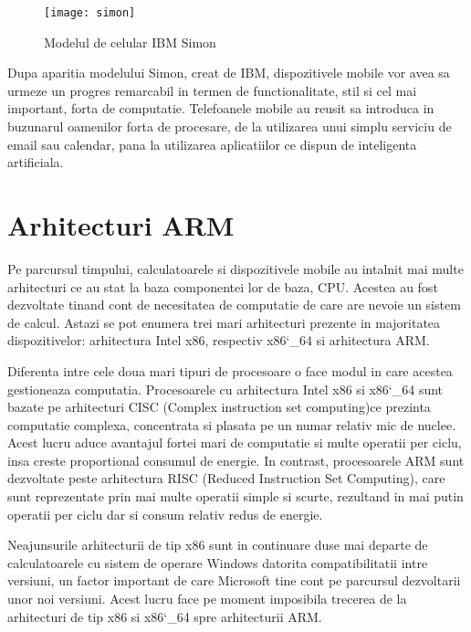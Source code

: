 	
	
		\begin{figure}[H]
		\texttt{[image: simon]}  
		\caption{\label{fig:simon} Modelul de celular IBM Simon
			\protect
			\footnotemark}
	\end{figure}
	
	
	Dupa aparitia modelului Simon, creat de IBM, dispozitivele mobile vor avea sa urmeze un progres remarcabil in termen de functionalitate, stil si cel mai important, forta de computatie. 
	Telefoanele mobile au reusit sa introduca in buzunarul oamenilor forta de procesare, de la utilizarea unui simplu serviciu de email sau calendar, pana la utilizarea aplicatiilor ce dispun de inteligenta artificiala. \cite{history_cellphones}
	\newline
	
	\section{Arhitecturi ARM}
	Pe parcursul timpului, calculatoarele si dispozitivele mobile au intalnit mai multe arhitecturi ce au stat la baza componentei lor de baza, CPU. Acestea au fost dezvoltate tinand cont de necesitatea de computatie de care are nevoie un sistem de calcul. Astazi se pot enumera trei mari arhitecturi prezente in majoritatea dispozitivelor: arhitectura Intel x86, respectiv x86\char`_64 si arhitectura ARM. 
	
	Diferenta intre cele doua mari tipuri de procesoare o face modul in care acestea gestioneaza computatia. Procesoarele cu arhitectura Intel x86 si x86\char`_64 sunt bazate pe arhitecturi CISC (Complex instruction set computing)ce prezinta computatie complexa, concentrata si plasata pe un numar relativ mic de nuclee. Acest lucru aduce avantajul fortei mari de computatie si multe operatii per ciclu, insa creste proportional consumul de energie. In contrast, procesoarele ARM sunt dezvoltate peste arhitectura RISC (Reduced Instruction Set Computing), care sunt reprezentate prin mai multe operatii simple si scurte, rezultand in mai putin operatii per ciclu dar si consum relativ redus de energie. 
	
	Neajunsurile arhitecturii de tip x86 sunt in continuare duse mai departe de calculatoarele cu sistem de operare Windows datorita compatibilitatii intre versiuni, un factor important de care Microsoft tine cont pe parcursul dezvoltarii unor noi versiuni. Acest lucru face pe moment imposibila trecerea de la arhitecturi de tip x86 si x86\char`_64 spre arhitecturii ARM. 
	
